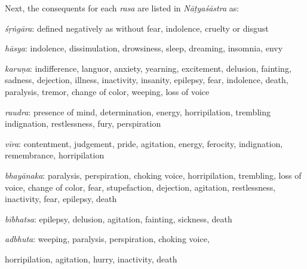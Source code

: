 Next, the consequents for each \textsl{rasa} are listed in \textsl{Nāṭyaśāstra} as: 

\textsl{śṛṅgāra}: defined negatively as without fear, indolence, cruelty or disgust

\textsl{hāsya}: indolence, dissimulation, drowsiness, sleep, dreaming, insomnia, envy

\textsl{karuṇa}: indifference, languor, anxiety, yearning, excitement, delusion, fainting, sadness, dejection, illness, inactivity, insanity, epilepsy, fear, indolence, death, paralysis, tremor, change of color, weeping, loss of voice

\textsl{raudra}: presence of mind, determination, energy, horripilation, trembling indignation, restlessness, fury, perspiration

\textsl{vīra}: contentment, judgement, pride, agitation, energy, ferocity, indignation, remembrance, horripilation

\textsl{bhayānaka}: paralysis, perspiration, choking voice, horripilation, trembling, loss of voice, change of color, fear, stupefaction, dejection, agitation, restlessness, inactivity, fear, epilepsy, death

\textsl{bībhatsa}: epilepsy, delusion, agitation, fainting, sickness, death

\textsl{adbhuta}:
 weeping, paralysis, perspiration, choking voice, 

horripilation, agitation, hurry, inactivity, death

